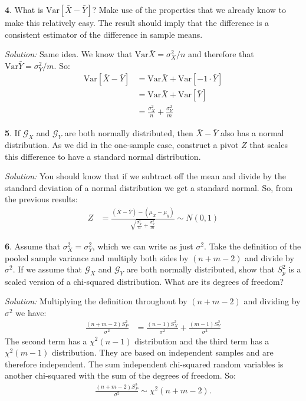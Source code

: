 \documentclass{tufte-handout}
\begin{document}
\textbf{4}. What is $\text{Var}[\bar{X} - \bar{Y}]$? Make use of the properties that we
already know to make this relatively easy. The result should imply that the
difference is a consistent estimator of the difference in sample means.

\textit{Solution:} Same idea. We know that $\text{Var}\bar{X} = \sigma^2_X/n$ and therefore that
$\text{Var}\bar{Y} = \sigma^2_Y/m$. So:
\begin{align*}
\text{Var}[\bar{X} - \bar{Y}] &= \text{Var}\bar{X} + \text{Var}[-1 \cdot \bar{Y}] \\
&= \text{Var}\bar{X} + \text{Var}[\bar{Y}] \\
&= \frac{\sigma^2_X}{n} + \frac{\sigma^2_Y}{m}
\end{align*}

\textbf{5}. If $\mathcal{G}_X$ and $\mathcal{G}_Y$ are both normally distributed, then
$\bar{X} - \bar{Y}$ also has a normal distribution. As we did in the one-sample
case, construct a pivot $Z$ that scales this difference to have a standard 
normal distribution.

\textit{Solution:} You should know that if we subtract off the mean and divide by the standard
deviation of a normal distribution we get a standard normal. So, from the
previous results:
\begin{align*}
Z &= \frac{(\bar{X} - \bar{Y}) - (\mu_X - \mu_y)}{\sqrt{\frac{\sigma^2_X}{n} + \frac{\sigma^2_Y}{m}}} \sim N(0, 1)
\end{align*}

\textbf{6}. Assume that $\sigma_X^2 = \sigma_Y^2$, which we can write as just $\sigma^2$.
Take the definition of the pooled sample variance and multiply both sides by
$(n + m - 2)$ and divide by $\sigma^2$. If we assume that $\mathcal{G}_X$ and
$\mathcal{G}_Y$ are both normally distributed, show that $S_p^2$ is a scaled
version of a chi-squared distribution. What are its degrees of freedom?

\textit{Solution:} Multiplying the definition throughout by $(n + m - 2)$ and dividing by $\sigma^2$
we have:
\begin{align*}
\frac{(n + m - 2) S_P^2}{\sigma^2} &= \frac{(n - 1) S_X^2}{\sigma^2} + \frac{(m - 1) S_Y^2}{\sigma^2}
\end{align*}
The second term has a $\chi^2(n-1)$ distribution and the third term has a 
$\chi^2(m-1)$ distribution. They are based on independent samples and are
therefore independent. The sum independent chi-squared random variables is
another chi-squared with the sum of the degrees of freedom. So:
\begin{align*}
\frac{(n + m - 2) S_P^2}{\sigma^2} \sim \chi^2(n + m - 2).
\end{align*}
\end{document}
